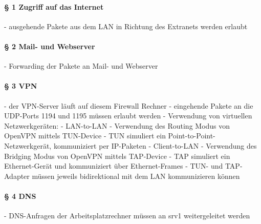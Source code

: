 \paragraph{§ 1 Zugriff auf das Internet}
- ausgehende Pakete aus dem LAN in Richtung des Extranets werden erlaubt

\paragraph{§ 2 Mail- und Webserver}
- Forwarding der Pakete an Mail- und Webserver

\paragraph{§ 3 VPN}
- der VPN-Server läuft auf diesem Firewall Rechner
- eingehende Pakete an die UDP-Ports 1194 und 1195 müssen erlaubt werden
- Verwendung von virtuellen Netzwerkgeräten:
- LAN-to-LAN
  - Verwendung des Routing Modus von OpenVPN mittels TUN-Device
  - TUN simuliert ein Point-to-Point-Netzwerkgerät, kommuniziert per IP-Paketen
- Client-to-LAN
  - Verwendung des Bridging Modus von OpenVPN mittels TAP-Device
  - TAP simuliert ein Ethernet-Gerät und kommuniziert über Ethernet-Frames
- TUN- und TAP-Adapter müssen jeweils bidirektional mit dem LAN kommunizieren können

\paragraph{§ 4 DNS}
- DNS-Anfragen der Arbeitsplatzrechner müssen an srv1 weitergeleitet werden

